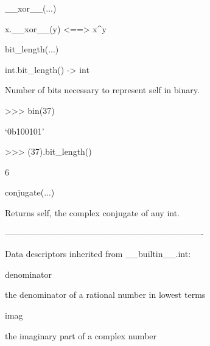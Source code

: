 \documentclass[letterpaper,10pt,english]{sphinxmanual}
\begin{document}
\begin{description}
\begin{description}
\begin{DUlineblock}{0em}
\item[] \_\_xor\_\_(...)
\item[]
\begin{DUlineblock}{\DUlineblockindent}
\item[] x.\_\_xor\_\_(y) \textless{}==\textgreater{} x\textasciicircum{}y
\item[] 
\end{DUlineblock}
\item[] bit\_length(...)
\item[]
\begin{DUlineblock}{\DUlineblockindent}
\item[] int.bit\_length() -\textgreater{} int
\item[] 
\item[] Number of bits necessary to represent self in binary.
\item[] \textgreater{}\textgreater{}\textgreater{} bin(37)
\item[] `0b100101'
\item[] \textgreater{}\textgreater{}\textgreater{} (37).bit\_length()
\item[] 6
\item[] 
\end{DUlineblock}
\item[] conjugate(...)
\item[]
\begin{DUlineblock}{\DUlineblockindent}
\item[] Returns self, the complex conjugate of any int.
\item[] 
\end{DUlineblock}
\item[] ----------------------------------------------------------------------
\item[] Data descriptors inherited from \_\_builtin\_\_.int:
\item[] 
\item[] denominator
\item[]
\begin{DUlineblock}{\DUlineblockindent}
\item[] the denominator of a rational number in lowest terms
\item[] 
\end{DUlineblock}
\item[] imag
\item[]
\begin{DUlineblock}{\DUlineblockindent}
\item[] the imaginary part of a complex number
\item[] 

\end{DUlineblock}
\end{DUlineblock}
\end{description}
\end{description}
\end{document}
